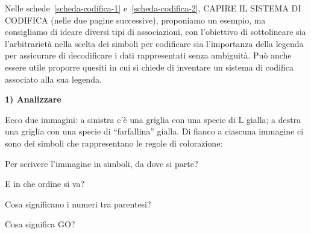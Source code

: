 Nelle schede~\ref{scheda-codifica-1} e~\ref{scheda-codifica-2}, CAPIRE IL SISTEMA DI CODIFICA (nelle due pagine successive), proponiamo un esempio, ma consigliamo di ideare diversi tipi di associazioni, con l'obiettivo di sottolineare sia l'arbitrarietà nella scelta dei simboli per codificare sia l'importanza della legenda per assicurare di decodificare i dati rappresentati senza ambiguità. Può anche essere utile proporre quesiti in cui si chiede di inventare un sistema di codifica associato alla sua legenda.\label{richiamo:cap05-schede-4ab}
\begin{scheda}[A1][5]
\label{scheda-codifica-1}
\textbf{1) Analizzare}\par
Ecco due immagini: a sinistra c'è una griglia con una specie di L gialla; a destra una griglia con una specie di ``farfallina'' gialla. Di fianco a ciascuna immagine ci sono dei simboli che rappresentano le regole di colorazione:\par
\vspace{4mm}
\noindent{}\par
\vspace{4mm}
Per scrivere l'immagine in simboli, da dove si parte?\par
E in che ordine si va?\par
{}
\vspace{5mm}
Cosa significano i numeri tra parentesi?\par
{}
\vspace{5mm}
Cosa significa GO?\par
{}
\end{scheda}

